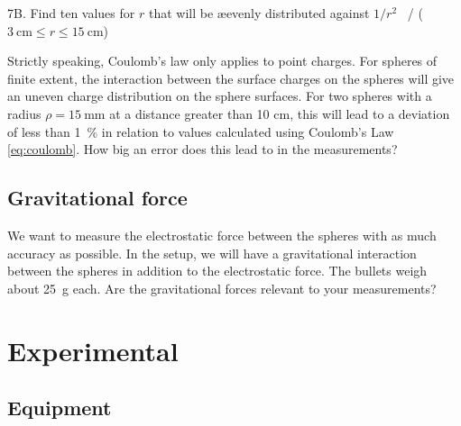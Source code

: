 \documentclass[../Elmag-labhefte-2020.tex]{subfiles}
\begin{document}
\begin{itemize}
{\itsf 7B. Find ten values   for $r$ that will be \ae evenly distributed against $1/r^2$ \ /} ($\SI{3}{\cm} \leq r \leq \SI{15}{\cm}$)


Strictly speaking, Coulomb's law only applies to point charges. For spheres of finite extent, the interaction between the surface charges on the spheres will give an uneven charge distribution on the sphere surfaces. For two spheres with a radius $\rho = \SI{15}{\milli\m}$ at a distance greater than 10 cm, this will lead to a deviation of less than \SI{1}{\percent} in relation to values   calculated using Coulomb's Law \eqref{eq:coulomb}. How big an error does this lead to in the measurements?


\subsection{Gravitational force}

We want to measure the electrostatic force between the spheres with as much accuracy as possible. In the setup, we will have a gravitational interaction between the spheres in addition to the electrostatic force. The bullets weigh about \SI{25}{\g} each. Are the gravitational forces relevant to your measurements?

 
\clearpage


\section{Experimental}

\subsection{Equipment}


\end{itemize}
\end{document}
